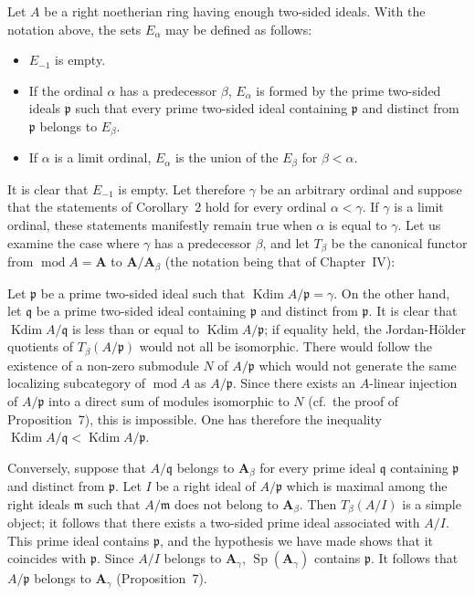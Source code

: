 \begin{corollary}
Let $A$ be a right noetherian ring having enough two-sided ideals. With
the notation above, the sets $E_\alpha$ may be defined as follows:
\begin{itemize}
\item $E_{-1}$ is empty.
\item If the ordinal $\alpha$ has a predecessor $\beta$, $E_\alpha$ is
  formed by the prime two-sided ideals $\mathfrak{p}$ such that every
  prime two-sided ideal containing $\mathfrak{p}$ and distinct from
  $\mathfrak{p}$ belongs to $E_\beta$.
\item If $\alpha$ is a limit ordinal, $E_\alpha$ is the union of the
  $E_\beta$ for $\beta < \alpha$.
\end{itemize}
\end{corollary}

It is clear that $E_{-1}$ is empty. Let therefore $\gamma$ be an
arbitrary ordinal and suppose that the statements of Corollary~2 hold
for every ordinal $\alpha < \gamma$. If $\gamma$ is a limit ordinal,
these statements manifestly remain true when $\alpha$ is equal to
$\gamma$. Let us examine the case where $\gamma$ has a predecessor
$\beta$, and let $T_\beta$ be the canonical functor from
$\operatorname{mod} A = \mathbf{A}$ to
$\mathbf{A}/\mathbf{A}_\beta$ (the notation being that of
Chapter~IV):

Let $\mathfrak{p}$ be a prime two-sided ideal such that
$\operatorname{Kdim} A/\mathfrak{p} = \gamma$. On the other hand, let
$\mathfrak{q}$ be a prime two-sided ideal containing $\mathfrak{p}$ and
distinct from $\mathfrak{p}$. It is clear that
$\operatorname{Kdim} A/\mathfrak{q}$ is less than or equal to
$\operatorname{Kdim} A/\mathfrak{p}$; if equality held, the
Jordan-H\"older quotients of $T_\beta(A/\mathfrak{p})$ would not all be
isomorphic. There would follow the existence of a non-zero submodule $N$
of $A/\mathfrak{p}$ which would not generate the same localizing
subcategory of $\operatorname{mod} A$ as $A/\mathfrak{p}$. Since there
exists an $A$-linear injection of $A/\mathfrak{p}$ into a direct sum of
modules isomorphic to $N$ (cf.~the proof of Proposition~7), this is
impossible. One has therefore the inequality
$\operatorname{Kdim} A/\mathfrak{q} < \operatorname{Kdim} A/\mathfrak{p}$.

Conversely, suppose that $A/\mathfrak{q}$ belongs to
$\mathbf{A}_\beta$ for every prime ideal $\mathfrak{q}$ containing
$\mathfrak{p}$ and distinct from $\mathfrak{p}$. Let $I$ be a right
ideal of $A/\mathfrak{p}$ which is maximal among the right ideals
$\mathfrak{m}$ such that $A/\mathfrak{m}$ does not belong to
$\mathbf{A}_\beta$. Then $T_\beta(A/I)$ is a simple object; it follows
that there exists a two-sided prime ideal associated with $A/I$. This
prime ideal contains $\mathfrak{p}$, and the hypothesis we have made
shows that it coincides with $\mathfrak{p}$. Since $A/I$ belongs to
$\mathbf{A}_\gamma$, $\operatorname{Sp}(\mathbf{A}_\gamma)$ contains
$\mathfrak{p}$. It follows that $A/\mathfrak{p}$ belongs to
$\mathbf{A}_\gamma$ (Proposition~7).

